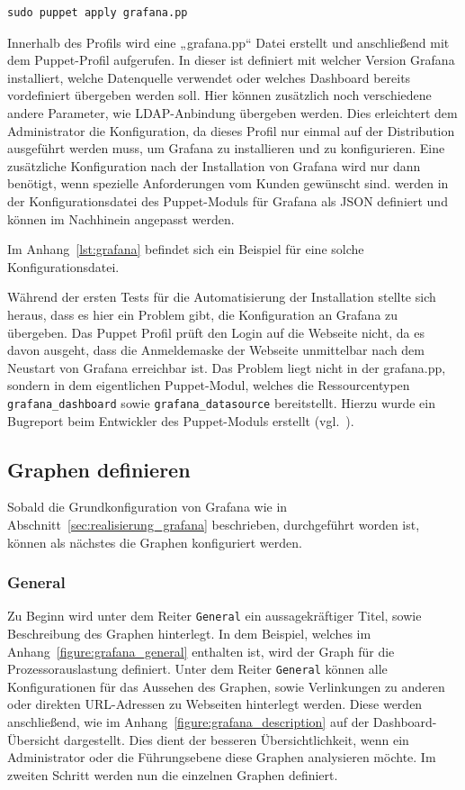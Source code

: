 \begin{verbatim}
sudo puppet apply grafana.pp
\end{verbatim}

Innerhalb des Profils wird eine „grafana.pp“ Datei erstellt und anschließend
mit dem Puppet\hyp{}Profil aufgerufen. In dieser ist definiert mit welcher
Version Grafana installiert, welche Datenquelle verwendet oder welches
\gls{Dashboard} bereits vordefiniert übergeben werden soll. Hier können
zusätzlich noch verschiedene andere Parameter, wie \gls{LDAP}\hyp{}Anbindung
übergeben werden. Dies erleichtert dem Administrator die Konfiguration, da
dieses Profil nur einmal auf der Distribution ausgeführt werden muss, um
Grafana zu installieren und zu konfigurieren. Eine zusätzliche Konfiguration
nach der Installation von Grafana wird nur dann benötigt, wenn spezielle
Anforderungen vom Kunden gewünscht sind.  werden
in der Konfigurationsdatei des Puppet\hyp{}Moduls für Grafana als \gls{JSON}
definiert und können im Nachhinein angepasst werden.

Im Anhang~\ref{lst:grafana} befindet sich ein Beispiel für eine solche
Konfigurationsdatei.

Während der ersten Tests für die Automatisierung der Installation stellte sich
heraus, dass es hier ein Problem gibt, die Konfiguration an Grafana zu
übergeben. Das Puppet Profil prüft den Login auf die Webseite nicht, da es
davon ausgeht, dass die Anmeldemaske der Webseite unmittelbar nach dem Neustart
von Grafana erreichbar ist. Das Problem liegt nicht in der grafana.pp, sondern
in dem eigentlichen Puppet\hyp{}Modul, welches die Ressourcentypen
\texttt{grafana\_dashboard} sowie \texttt{grafana\_datasource} bereitstellt.
Hierzu wurde ein Bugreport beim Entwickler des Puppet\hyp{}Moduls erstellt
(vgl.~\cite{grafana-issue}).
\mr%

\subsection{Graphen definieren}
\label{subsec:graphen-definieren}
Sobald die Grundkonfiguration von Grafana wie in
Abschnitt~\ref{sec:realisierung_grafana} beschrieben, durchgeführt worden ist,
können als nächstes die Graphen konfiguriert werden.
\mr%

\subsubsection{General}
Zu Beginn wird unter dem Reiter \texttt{General} ein aussagekräftiger Titel,
sowie Beschreibung des Graphen hinterlegt. In dem Beispiel, welches im
Anhang~\ref{figure:grafana_general} enthalten ist, wird der Graph für die
Prozessorauslastung definiert. Unter dem Reiter \texttt{General} können alle
Konfigurationen für das Aussehen des Graphen, sowie Verlinkungen zu anderen
 oder direkten URL\hyp{}Adressen zu Webseiten
hinterlegt werden. Diese werden anschließend, wie im
Anhang~\ref{figure:grafana_description} auf der \gls{Dashboard}\hyp{}Übersicht
dargestellt. Dies dient der besseren Übersichtlichkeit, wenn ein Administrator
oder die Führungsebene diese Graphen analysieren möchte. Im zweiten Schritt
werden nun die einzelnen Graphen definiert.
\mr%

